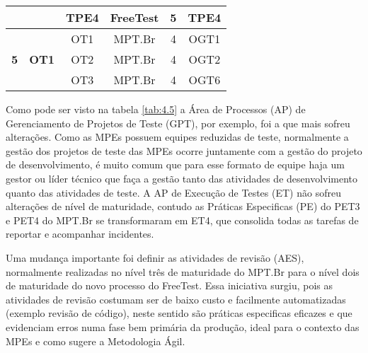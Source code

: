 \begin{table}[H]
{\begin{tabular}{|c|c|c|c|c|c|}
                                                                                &                               & TPE4        & \textbf{FreeTest} & 5                                                                                  & TPE4                                                                      \\ \hline
\multirow{3}{*}{\textbf{5}}                                                     & \multirow{3}{*}{\textbf{OT1}} & OT1         & MPT.Br            & 4                                                                                  & OGT1                                                                      \\ \cline{3-6} 
                                                                                &                               & OT2         & MPT.Br            & 4                                                                                  & OGT2                                                                      \\ \cline{3-6} 
                                                                                &                               & OT3         & MPT.Br            & 4                                                                                  & OGT6                                                                      \\ \hline
\end{tabular}
}
\end{table}

Como pode ser visto na tabela \ref{tab:4.5} a Área de Processos (AP) de Gerenciamento de Projetos de Teste (GPT), por exemplo, foi a que mais sofreu alterações. Como as MPEs possuem equipes reduzidas de teste, normalmente a gestão dos projetos de teste das MPEs ocorre juntamente com a gestão do projeto de desenvolvimento, é muito comum que para esse formato de equipe haja um gestor ou líder técnico que faça a gestão tanto das atividades de desenvolvimento quanto das atividades de teste. A AP de Execução de Testes (ET) não sofreu alterações de nível de maturidade, contudo as Práticas Especificas (PE) do PET3 e PET4 do MPT.Br se transformaram em ET4, que consolida todas as tarefas de reportar e acompanhar incidentes.

Uma mudança importante foi definir as atividades de revisão (AES), normalmente realizadas no nível três de maturidade do MPT.Br para o nível dois de maturidade do novo processo do FreeTest. Essa iniciativa surgiu, pois as atividades de revisão costumam ser de baixo custo e facilmente automatizadas (exemplo revisão de código), neste sentido são práticas especificas eficazes e que evidenciam erros numa fase bem primária da produção, ideal para o contexto das MPEs e como sugere a Metodologia Ágil.

